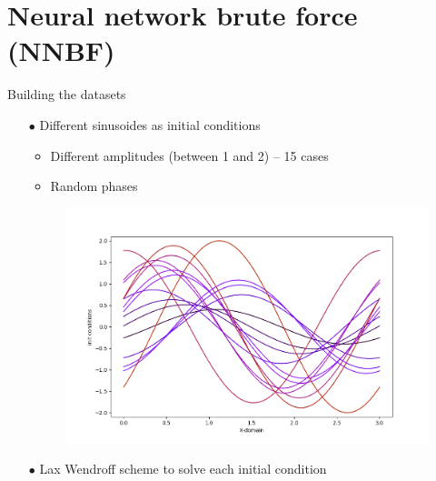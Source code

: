 \documentclass[10pt,
			   xcolor=svgnames,
			   hyperref={linkcolor=red, citecolor = DarkGreen, colorlinks=true, urlcolor=Navy}]{beamer}
\newcommand{\sarrow}{\item[\color{blue!50!black!70!orange!60} \tiny{\ding{55}}]}
\begin{document}
\section{Neural network brute force (NNBF)}
\begin{frame}{Building the datasets}

	\begin{itemize}
		\item[$\bullet$] Different sinusoides as initial conditions

		\begin{itemize}
			\sarrow Different amplitudes (between 1 and 2) -- 15 cases
			\sarrow Random phases
 		\end{itemize}
	
	\begin{figure}[H]
		\vspace{-0.3cm}		
		\centering
		\includegraphics[scale=0.3]{Initialisation_cases.png}
	\end{figure}			
		
 		\item[$\bullet$] Lax Wendroff scheme to solve each initial condition
	\end{itemize}
\end{frame}
\end{document}
